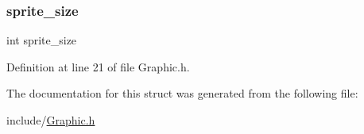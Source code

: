 \mbox{\label{structgraphic_aab4af5e471f473d0a94d8ea7e8e43f06}} 
\subsubsection{\texorpdfstring{sprite\+\_\+size}{sprite\_size}}
{\footnotesize\ttfamily int sprite\+\_\+size}



Definition at line 21 of file Graphic.\+h.



The documentation for this struct was generated from the following file\+:\begin{DoxyCompactItemize}
\item 
include/\hyperlink{_graphic_8h}{Graphic.\+h}\end{DoxyCompactItemize}
